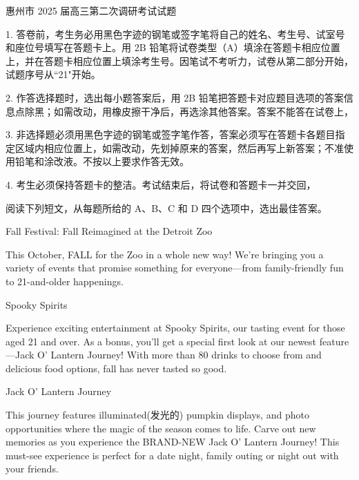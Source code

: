 \documentclass{英语试卷}
\begin{document}
\par 惠州市 2025 届高三第二次调研考试试题\par
\begin{notice}
\par 1. 答卷前，考生务必用黑色字迹的钢笔或签字笔将自己的姓名、考生号、试室号和座位号填写在答题卡上。用 2B 铅笔将试卷类型（A）填涂在答题卡相应位置上，并在答题卡相应位置上填涂考生号。因笔试不考听力，试卷从第二部分开始，试题序号从“21"开始。\par
\par 2. 作答选择题时，选出每小题答案后，用 2B 铅笔把答题卡对应题目选项的答案信息点除黑；如需改动，用橡皮擦干净后，再选涂其他答案。答案不能答在试卷上，\par
\par 3. 非选择题必须用黑色字迹的钢笔或签字笔作答，答案必须写在答题卡各题目指定区域内相应位置上，如需改动，先划掉原来的答案，然后再写上新答案；不准使用铅笔和涂改液。不按以上要求作答无效。\par
\par 4. 考生必须保持答题卡的整洁。考试结束后，将试卷和答题卡一并交回，\par
\end{notice}
\par 阅读下列短文，从每题所给的 A、B、C 和 D 四个选项中，选出最佳答案。\par
{}
\par Fall Festival: Fall Reimagined at the Detroit Zoo\par
\par This October, FALL for the Zoo in a whole new way! We're bringing you a variety of events that promise something for everyone—from family-friendly fun to 21-and-older happenings.\par
\par Spooky Spirits\par
\par Experience exciting entertainment at Spooky Spirits, our tasting event for those aged 21 and over. As a bonus, you'll get a special first look at our newest feature—Jack O' Lantern Journey! With more than 80 drinks to choose from and delicious food options, fall has never tasted so good.\par
\par Jack O' Lantern Journey\par
\par This journey features illuminated(发光的) pumpkin displays, and photo opportunities where the magic of the season comes to life. Carve out new memories as you experience the BRAND-NEW Jack O' Lantern Journey! This must-see experience is perfect for a date night, family outing or night out with your friends.\par
\end{document}
